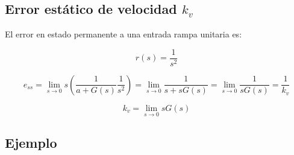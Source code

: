 
        \subsection{Error estático de velocidad $k_v$}
            El error en estado permanente a una entrada rampa unitaria es:

            \begin{equation*}
                r(s) = \frac{1}{s^2}
            \end{equation*}

            \begin{equation*}
                e_{ss} = \lim_{s \to 0} s \left( \frac{1}{a + G(s)} \frac{1}{s^2} \right) = \lim_{s \to 0} \frac{1}{s + s G(s)} = \lim_{s \to 0} \frac{1}{s G(s)} = \frac{1}{k_v}
            \end{equation*}

            \begin{equation*}
                k_v = \lim_{s \to 0} s G(s)
            \end{equation*}



        \subsection{Ejemplo}
